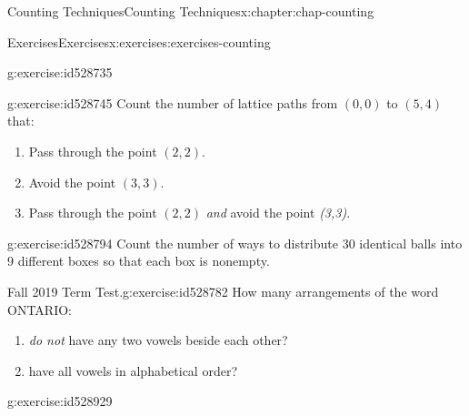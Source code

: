 \documentclass[oneside,10pt,]{book}
\numberwithin{equation}{section}
\begin{document}
\begin{chapterptx}{Counting Techniques}{}{Counting Techniques}{}{}{x:chapter:chap-counting}
\begin{exercises-section}{Exercises}{}{Exercises}{}{}{x:exercises:exercises-counting}
\begin{divisionexercise}{14}{}{}{g:exercise:id528735}
\begin{sidebyside}{3}{0.0916666666666667}{0.0916666666666667}{0.183333333333333}
\begin{sbspanel}{0.15}
%
\end{sbspanel}%
\end{sidebyside}%
\end{divisionexercise}%
\begin{divisionexercise}{15}{}{}{g:exercise:id528745}%
Count the number of lattice paths from \((0,0)\) to \((5,4)\) that:%
\begin{enumerate}[label=(\alph*)]
\item{}Pass through the point \((2,2)\).%
\item{}Avoid the point \((3,3)\).%
\item{}Pass through the point \((2,2)\) \emph{and} avoid the point \emph{(3,3)}.%
\end{enumerate}
%
\begin{sidebyside}{1}{0.3}{0.3}{0}%
\begin{sbspanel}{0.4}%
%
\end{sbspanel}%
\end{sidebyside}%
\end{divisionexercise}%
\begin{divisionexercise}{16}{}{}{g:exercise:id528794}%
Count the number of ways to distribute 30 identical balls into 9 different boxes so that each box is nonempty.%
\end{divisionexercise}%
\begin{divisionexercise}{17}{Fall 2019 Term Test.}{}{g:exercise:id528782}%
How many arrangements of the word ONTARIO:%
\begin{enumerate}[label=(\alph*)]
\item{}\emph{do not} have any two vowels beside each other?%
\item{}have all vowels in alphabetical order?%
\end{enumerate}
%
\end{divisionexercise}%
\begin{divisionexercise}{18}{}{}{g:exercise:id528929}%

\end{divisionexercise}
\end{exercises-section}
\end{chapterptx}
\end{document}
